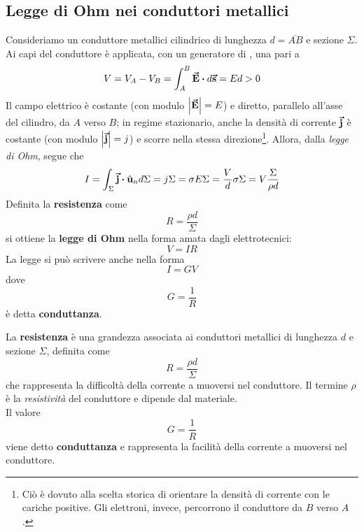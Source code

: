 \subsection{Legge di Ohm nei conduttori metallici}
Consideriamo un conduttore metallici cilindrico di lunghezza $d=\overline{AB}$ e sezione $\Sigma$. Ai capi del conduttore è applicata, con un generatore di \fem, una \ddp pari a
\begin{equation*}
	V=V_A-V_B=\int_{A}^{B}\vba{E}\vdot d\vba{s}=Ed>0
\end{equation*}
Il campo elettrico è costante (con modulo $\abs{\vb*{\va{E}}}=E$) e diretto, parallelo all'asse del cilindro, da $A$ verso $B$; in regime stazionario, anche la densità di corrente $\vb*{\va{j}}$ è costante (con modulo $\abs{\vb*{\va{j}}}=j$) e scorre nella stessa direzione\footnote{Ciò è dovuto alla scelta storica di orientare la densità di corrente con le cariche positive. Gli elettroni, invece, percorrono il conduttore da $B$ verso $A$.}. Allora, dalla \textit{legge di Ohm}, segue che
\begin{equation*}
	I=\int_{\Sigma}\vba{j}\vdot\vbh{u}_nd\Sigma=j\Sigma=\sigma E\Sigma=\frac{V}{d}\sigma\Sigma=V\frac{\Sigma}{\rho d}
\end{equation*}
Definita la \textbf{resistenza} come
\begin{equation*}
	R=\frac{\rho d}{\Sigma}
\end{equation*}
si ottiene la \textbf{legge di Ohm} nella forma amata dagli elettrotecnici:
\begin{equation}
	V=IR
\end{equation}
La legge si può scrivere anche nella forma
\begin{equation}
	I=GV
\end{equation}
dove
\begin{equation*}
	G=\frac{1}{R}
\end{equation*}
è detta \textbf{conduttanza}.
\begin{define}
	La \textbf{resistenza} è una grandezza associata ai conduttori metallici di lunghezza $d$ e sezione $\Sigma$, definita come
	\begin{equation*}
		R=\frac{\rho d}{\Sigma}
	\end{equation*}
	che rappresenta la difficoltà della corrente a muoversi nel conduttore. Il termine $\rho$ è la \textit{resistività} del conduttore e dipende dal materiale.\\
	Il valore
	\begin{equation}
		G=\frac{1}{R}
	\end{equation}
	viene detto \textbf{conduttanza} e rappresenta la facilità della corrente a muoversi nel conduttore.
\end{define}
